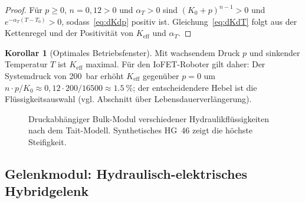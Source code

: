 ﻿\documentclass[a4paper,12pt]{scrreprt}
\theoremstyle{definition}
\newtheorem{korollar}{Korollar}[section]
\begin{document}
\begin{proof}
Für $p \geq 0$, $n = 0{,}12 > 0$ und $\alpha_T > 0$ sind $(K_0+p)^{n-1} > 0$
und $e^{-\alpha_T(T-T_0)} > 0$, sodass~\eqref{eq:dKdp} positiv ist.
Gleichung~\eqref{eq:dKdT} folgt aus der Kettenregel und der
Positivität von $K_{\text{eff}}$ und $\alpha_T$.
\end{proof}

\begin{korollar}[Optimales Betriebsfenster]
\label{kor:betrieb}
Mit wachsendem Druck $p$ und sinkender Temperatur $T$ ist
$K_{\text{eff}}$ maximal. Für den IoFET-Roboter gilt daher:
Der Systemdruck von \SI{200}{\bar} erhöht $K_{\text{eff}}$ gegenüber
$p=0$ um $n \cdot p / K_0 \approx 0{,}12 \cdot 200/16500 \approx \SI{1.5}{\percent}$;
der entscheidendere Hebel ist die Flüssigkeitsauswahl (vgl.
Abschnitt über Lebensdauerverlängerung).
\end{korollar}

\begin{figure}[H]
\centering
{}
\caption{Druckabhängiger Bulk-Modul verschiedener Hydraulikflüssigkeiten
  nach dem Tait-Modell. Synthetisches HG~46 zeigt die höchste Steifigkeit.}
\label{fig:bulkmodul}
\end{figure}

\subsection{Gelenkmodul: Hydraulisch-elektrisches Hybridgelenk}
\end{document}
